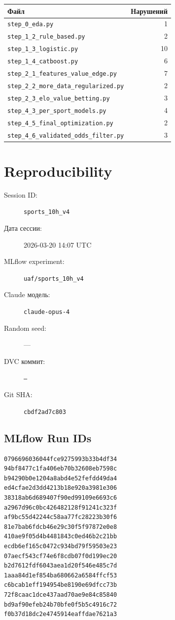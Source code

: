 \documentclass[12pt,a4paper]{article}
\begin{document}
\begin{longtable}{lr}
\toprule
Файл & Нарушений \\
\midrule
\endhead
\texttt{step\_0\_eda.py} & 1 \\
\texttt{step\_1\_2\_rule\_based.py} & 2 \\
\texttt{step\_1\_3\_logistic.py} & 10 \\
\texttt{step\_1\_4\_catboost.py} & 6 \\
\texttt{step\_2\_1\_features\_value\_edge.py} & 7 \\
\texttt{step\_2\_2\_more\_data\_regularized.py} & 2 \\
\texttt{step\_2\_3\_elo\_value\_betting.py} & 3 \\
\texttt{step\_4\_3\_per\_sport\_models.py} & 4 \\
\texttt{step\_4\_5\_final\_optimization.py} & 2 \\
\texttt{step\_4\_6\_validated\_odds\_filter.py} & 3 \\
\bottomrule
\end{longtable}




\section{Reproducibility}

\begin{description}
    \item[Session ID:] \texttt{sports\_10h\_v4}
    \item[Дата сессии:] 2026-03-20 14:07 UTC
    \item[MLflow experiment:] \texttt{uaf/sports\_10h\_v4}
    \item[Claude модель:] \texttt{claude-opus-4}
    \item[Random seed:] ---
    \item[DVC коммит:] \texttt{---}
    \item[Git SHA:] \texttt{cbdf2ad7c803}
\end{description}

\subsection*{MLflow Run IDs}

\begin{lstlisting}
0796696036044fce9275993b33b4df34
94bf8477c1fa406eb70b32608eb7598c
b94290b0e1204a8abd4e52fefdd49da4
ed4cfae2d3dd4213b18e920a3981e306
38318ab6d689407f90ed99109e6693c6
a2967d96c0bc426482128f91241c323f
af9bc55d42244c58aa77fc28223b30f6
81e7bab6fdcb46e29c30f5f97872e0e8
410ae9f05d4b4481843c0ed46b2c21bb
ecdb6ef165c0472c934bd79f59503e23
07aecf543cf74e6f8cdb07f0d199ec20
b2d7612fdf6043aea1d20f546e485c7d
1aaa84d1ef854ba680662a6584ffcf53
c6bcab1eff194954be8190e69dfcc73b
72f8caac1dce437aad70ae9e84c85840
bd9af90efeb24b70bfe0f5b5c4916c72
f0b37d18dc2e4745914eaffdae7621a3
\end{lstlisting}
\end{document}
